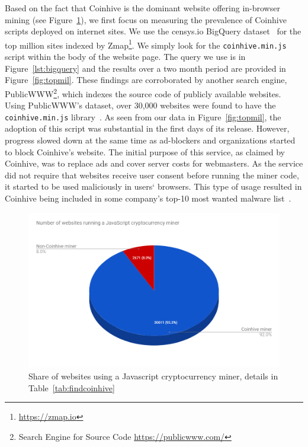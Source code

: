 Based on the fact that Coinhive is the dominant website offering in-browser mining  (see Figure~\ref{fig:coinhivevscopycats}), we first focus on measuring the prevalence of Coinhive scripts deployed on internet sites. We use the censys.io BigQuery dataset~\cite{censys15} for the top million sites indexed by Zmap\footnote{\url{https://zmap.io}}. We simply look for the \texttt{coinhive.min.js} script within the body of the website page. The query we use is in Figure~\ref{lst:bigquery} and the results over a two month period are provided in Figure~\ref{fig:topmil}. These findings are corroborated by another search engine, PublicWWW\footnote{Search Engine for Source Code \url{https://publicwww.com/}}, which indexes the source code of publicly available websites. Using PublicWWW's dataset, over 30,000 websites were found to have the \texttt{coinhive.min.js} library~\cite{badpacketspublicwww}. As seen from our data in Figure~\ref{fig:topmil}, the adoption of this script was substantial in the first days of its release. However, progress slowed down at the same time as ad-blockers and organizations started to block Coinhive's website. The initial purpose of this service, as claimed by Coinhive, was to replace ads and cover server costs for webmasters. As the service did not require that websites receive user consent before running the miner code, it started to be used maliciously in users` browsers. This type of usage resulted in Coinhive being included in some company's top-10 most wanted malware list~\cite{checkpoint}.


\begin{figure}[t]
\centering
\includegraphics[width=0.9\linewidth]{figures/coinhive-miners-pie.png}
\caption{Share of websites using a Javascript cryptocurrency miner, details in Table~\ref{tab:findcoinhive}  \label{fig:coinhivevscopycats}}
\end{figure}

